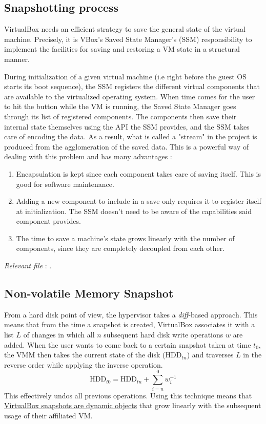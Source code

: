 \subsection*{Snapshotting process}

VirtualBox needs an efficient strategy to save the general state of the virtual machine. Precisely, it is VBox's Saved State Manager's (SSM) responsibility to implement the facilities for saving and restoring a VM state in a structural manner.

During initialization of a given virtual machine (i.e right before the guest OS starts its boot sequence), the SSM registers the different virtual components that are available to the virtualized operating system. When time comes for the user to hit the  button while the VM is running, the Saved State Manager goes through its list of registered components. The components then save their internal state themselves using the API the SSM provides, and the SSM takes care of encoding the data. As a result, what is called a "stream" in the project is produced from the agglomeration of the saved data. This is a powerful way of dealing with this problem and has many advantages :
\begin{enumerate}
	\item Encapsulation is kept since each component takes care of saving itself. This is good for software maintenance.
	\item Adding a new component to include in a save only requires it to register itself at initialization. The SSM doesn't need to be aware of the capabilities said component provides.
	\item The time to save a machine's state grows linearly with the number of components, since they are completely decoupled from each other.
\end{enumerate}

\hfill\textit{Relevant file }: .

\subsection*{Non-volatile Memory Snapshot}

From a hard disk point of view, the hypervisor takes a \textit{diff}-based approach. This means that from the time a snapshot is created, VirtualBox associates it with a list $L$ of changes in which all $n$  subsequent hard disk write operations $w$ are added. When the user wants to come back to a certain snapshot taken at time $t_0$, the \gls{VMM} then takes the current state of the disk ($\text{HDD}_{tn}$) and traverses $L$ in the reverse order while applying the inverse operation.
\[
\text{HDD}_{t0} = \text{HDD}_{tn} + \sum_{i=n}^{0}w_i^{-1}
\]
This effectively undos all previous operations. Using this technique means that \ul{VirtualBox snapshots are dynamic objects} that grow linearly with the subsequent usage of their affiliated VM.

